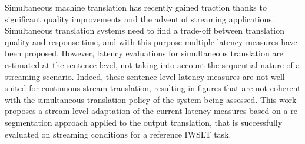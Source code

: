Simultaneous machine translation has recently gained traction thanks to significant quality improvements and the advent of streaming applications. Simultaneous translation systems need to find a trade-off between translation quality and response time, and with this purpose multiple latency measures have been proposed. However, latency evaluations for simultaneous translation are estimated at the sentence level, not taking into account the sequential nature of a streaming scenario. Indeed, these sentence-level latency measures are not well suited for continuous stream translation, resulting in figures that are not coherent with the simultaneous translation policy of the system being assessed. This work proposes a stream level adaptation of the current latency measures based on a re-segmentation approach applied to the output translation, that is successfully evaluated on streaming conditions for a reference IWSLT task.
